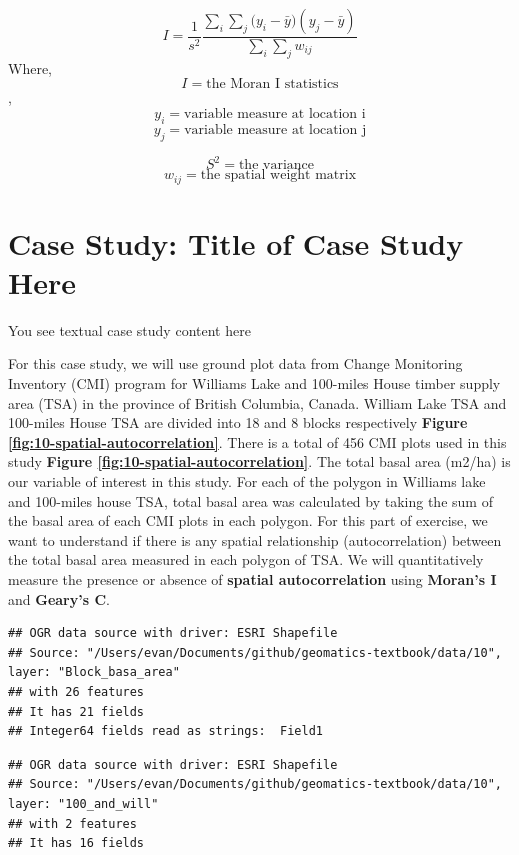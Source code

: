 \documentclass[
]{book}
\begin{document}
\[
I= \frac{1}{s^2} \frac{\sum_{i}\sum_{j}({y_i-\bar{y})({y_j-\bar{y}})}}
{\sum_{i}\sum_{j}w_{ij}}
\]
Where, \[I=\text{the Moran I statistics}\], \[y_i=\text{variable measure at location i}\]
\[y_j=\text{variable measure at location j}\]

\[S^2=\text{the variance}\]
\[w_{ij}=\text{the spatial weight matrix}\]

\hypertarget{case-study-title-of-case-study-here}{%
\section{Case Study: Title of Case Study Here}\label{case-study-title-of-case-study-here}}

You see textual case study content here

For this case study, we will use ground plot data from Change Monitoring Inventory (CMI) program \citep[for details:][]{province_of_bc_provincial_2018} for Williams Lake and 100-miles House timber supply area (TSA) in the province of British Columbia, Canada. William Lake TSA and 100-miles House TSA are divided into 18 and 8 blocks respectively \textbf{Figure \ref{fig:10-spatial-autocorrelation}}. There is a total of 456 CMI plots used in this study \textbf{Figure \ref{fig:10-spatial-autocorrelation}}. The total basal area (m2/ha) is our variable of interest in this study. For each of the polygon in Williams lake and 100-miles house TSA, total basal area was calculated by taking the sum of the basal area of each CMI plots in each polygon. For this part of exercise, we want to understand if there is any spatial relationship (autocorrelation) between the total basal area measured in each polygon of TSA. We will quantitatively measure the presence or absence of \textbf{spatial autocorrelation} using \textbf{Moran's I} and \textbf{Geary's C}.

\begin{verbatim}
## OGR data source with driver: ESRI Shapefile 
## Source: "/Users/evan/Documents/github/geomatics-textbook/data/10", layer: "Block_basa_area"
## with 26 features
## It has 21 fields
## Integer64 fields read as strings:  Field1
\end{verbatim}

\begin{verbatim}
## OGR data source with driver: ESRI Shapefile 
## Source: "/Users/evan/Documents/github/geomatics-textbook/data/10", layer: "100_and_will"
## with 2 features
## It has 16 fields
\end{verbatim}
\end{document}
